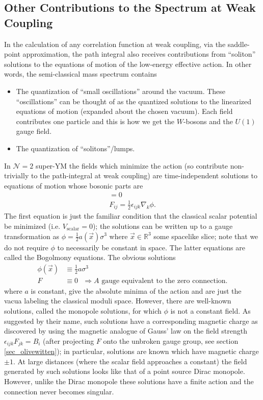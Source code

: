 \documentclass[12pt, onecolumn]{article}
\begin{document}
\subsection{Other Contributions to the Spectrum at Weak Coupling}
\label{sec_solitons}
In the calculation of any correlation function at weak coupling, via the saddle-point approximation, the path integral also receives contributions from ``soliton'' solutions to the equations of motion of the low-energy effective action.  In other words, the semi-classical mass spectrum contains
\begin{itemize}
\item The quantization of ``small oscillations'' around the vacuum.   These ``oscillations'' can be thought of as the quantized solutions to the linearized equations of motion (expanded about the chosen vacuum).  Each field contributes one particle and this is how we get the $W$-bosons and the $U(1)$ gauge field.
\item The quantization of ``solitons''/lumps.
\end{itemize}


\vspace{5mm}

\noindent In $\mathcal{N}=2$ super-YM the fields which minimize the action (so contribute non-trivially to the path-integral at weak coupling) are time-independent solutions to equations of motion whose bosonic parts are
\begin{align*}
[\phi,\overline{\phi}]=0\\
F_{ij}=\frac{1}{2}\epsilon_{ijk}\nabla_{k}\phi.
\end{align*}
The first equation is just the familiar condition that the classical scalar potential be minimized (i.e. $V_{\text{scalar}}=0$); the solutions can be written up to a gauge transformation as $\phi=\frac{1}{2}a(\vec{x})\sigma^{3}$ where $\vec{x} \in \mathbb{R}^{3}$ some spacelike slice; note that we do not require $\phi$ to necessarily be constant in space.  The latter equations are called the Bogolmony equations.  The obvious solutions
\begin{align*}
\phi(\vec{x}) &\equiv \frac{1}{2}a \sigma^3\\
F &\equiv 0 \text{ $\Rightarrow A$ gauge equivalent to the zero connection}.
\end{align*}
where $a$ is constant, give the absolute minima of the action and are just the vacua labeling the classical moduli space.  However, there are well-known solutions, called the monopole solutions, for which $\phi$ is not a constant field.  As suggested by their name, such solutions have a corresponding magnetic charge as discovered by using the magnetic analogue of Gauss' law on the field strength $\epsilon_{ijk}F_{jk}=B_{i}$ (after projecting $F$ onto the unbroken gauge group, see section \ref{sec_olivewitten}); in particular, solutions are known which have magnetic charge $\pm 1$.  At large distances (where the scalar field approaches a constant) the field generated by such solutions looks like that of a point source Dirac monopole.  However, unlike the Dirac monopole these solutions have a finite action and the connection never becomes singular.
\end{document}
